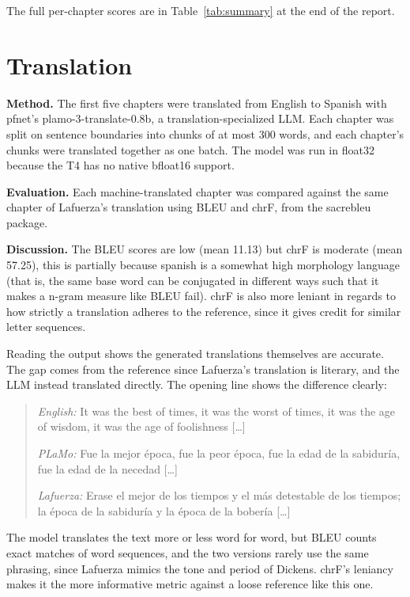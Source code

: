 \documentclass[11pt]{article}
\begin{document}
The full per-chapter scores are in Table~\ref{tab:summary} at the end
of the report.

\section{Translation}

\textbf{Method.} The first five chapters were
translated from English to Spanish with pfnet's
plamo-3-translate-0.8b, a translation-specialized
LLM. Each chapter was split on sentence boundaries into chunks of at
most 300 words, and each chapter's chunks were translated together as
one batch. The model was run in float32 because the T4 has no native
bfloat16 support.

\textbf{Evaluation.} Each machine-translated chapter was compared
against the same
chapter of Lafuerza's translation using BLEU and chrF, from the
sacrebleu package.



\textbf{Discussion.} The BLEU scores are low (mean 11.13) but chrF is moderate
(mean 57.25), this is partially because spanish is a somewhat high
morphology language (that is, the same base word can be conjugated in
different ways such that it makes a n-gram measure like BLEU fail).
chrF is also more leniant in regards to how strictly a translation
adheres to the reference, since it gives credit for similar letter sequences.

Reading the output shows the generated translations themselves are
accurate. The gap comes from the reference since Lafuerza's
translation is literary, and the LLM instead translated directly. The
opening line shows the difference clearly:

\begin{quote}\small
  \textit{English:} It was the best of times, it was the worst of
  times, it was the age
  of wisdom, it was the age of foolishness [\ldots]

  \textit{PLaMo:} Fue la mejor época, fue la peor época, fue la edad
  de la sabiduría,
  fue la edad de la necedad [\ldots]

  \textit{Lafuerza:} Erase el mejor de los tiempos y el más
  detestable de los tiempos;
  la época de la sabiduría y la época de la bobería [\ldots]
\end{quote}

The model translates the text more or less word for word, but BLEU counts exact
matches of word sequences, and the two versions rarely use the same
phrasing, since Lafuerza mimics the tone and period of Dickens.
chrF's leniancy makes it the more informative metric against a loose
reference like this one.
\end{document}
